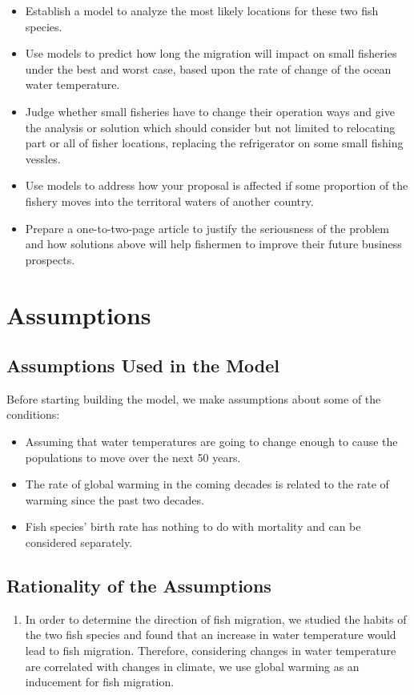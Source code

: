 \documentclass{mcmthesis}
\begin{document}
\begin{itemize}
	\item Establish a model to analyze the most likely locations for these two fish species.
	\item Use models to predict how long the migration will impact on small fisheries under the best and worst case, based upon the rate of change of the ocean water temperature.
	\item Judge whether small fisheries have to change their operation ways and give the analysis or solution which should consider but not limited to relocating part or all of fisher locations, replacing the refrigerator on some small fishing vessles.
	\item Use models to address how your proposal is affected if some proportion of the fishery moves into the territoral waters of another country.
	\item Prepare a one-to-two-page article to justify the seriousness of the problem and how solutions above will help fishermen to improve their future business prospects.
\end{itemize}

\section{Assumptions}
\subsection{Assumptions Used in the Model}
Before starting building the model, we make assumptions about some of the conditions:

\begin{itemize}
	\item Assuming that water temperatures are going to change enough to cause the populations to move over the next 50 years.
	\item The rate of global warming in the coming decades is related to the rate of warming since the past two decades.
	\item Fish species' birth rate has nothing to do with mortality and can be considered separately.
\end{itemize}

\subsection{Rationality of the Assumptions}
\begin{enumerate}
	\item In order to determine the direction of fish migration, we studied the habits of the two fish species and found that an increase in water temperature would lead to fish migration. Therefore, considering changes in water temperature are correlated with changes in climate, we use global warming as an inducement for fish migration.
\end{enumerate}
\end{document}
